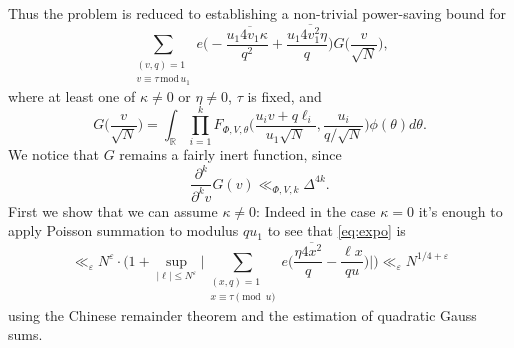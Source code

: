 \documentclass[12pt,reqno]{amsart}
\theoremstyle{plain}
\numberwithin{equation}{section}
\numberwithin{figure}{section}
\theoremstyle{plain}
\theoremstyle{definition}
\theoremstyle{remark}
\newcommand{\mmod}{\,\mathrm{mod}\,}
\begin{document}
Thus the problem is reduced to establishing a non-trivial power-saving bound for 
\begin{equation} \label{eq:mainexp}
\sum_{\substack{(v, q) = 1 \\ v \equiv \tau \mmod{u_1}}} e \Big ( - \frac{u_1 \overline{4 v_1} \kappa}{q^2} + \frac{u_1 \overline{4 v_1^2} \eta}{q} \Big ) G \Big ( \frac{v}{\sqrt{N}} \Big ),
\end{equation}
where at least one of $\kappa \neq 0$ or $\eta \neq 0$, $\tau$ is fixed, and
\begin{equation} \label{eq:expo}
G \Big ( \frac{v}{\sqrt{N}} \Big ) = \int_{\mathbb{R}} \prod_{i = 1}^{k} F_{\Phi, V, \theta} \Big ( \frac{u_i v + q \ell_i}{u_1 \sqrt{N}} , \frac{u_i}{q / \sqrt{N}} \Big ) \phi(\theta) d \theta.  
\end{equation}
We notice that $G$ remains a fairly inert function, since
$$
\frac{\partial^k}{\partial^k v} G(v) \ll_{\Phi, V,k} \Delta^{4 k}. 
$$ 
First we show that we can assume $\kappa \neq 0$: Indeed in the case $\kappa = 0$ it's enough to apply Poisson summation to modulus $q u_1$ to see that \eqref{eq:expo} is 
$$
\ll_{\varepsilon} N^{\varepsilon} \cdot \Big ( 1 + \sup_{|\ell| \leq N^{\varepsilon}} \Big | \sum_{\substack{(x, q) = 1 \\ x \equiv \tau \pmod{u}}} e \Big ( \frac{\eta \overline{4 x^2}}{q} - \frac{\ell x}{q u} \Big ) \Big | \Big ) \ll_{\varepsilon} N^{1/4 + \varepsilon}
$$
using the Chinese remainder theorem and the estimation of quadratic Gauss sums. 
\end{document}
